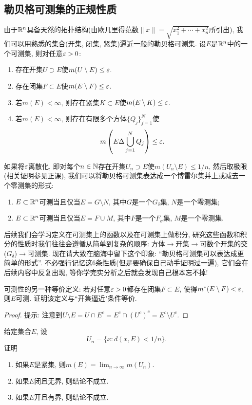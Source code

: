 \subsection{勒贝格可测集的正规性质}
由于$\mathbb{R}^n$具备天然的拓扑结构(由欧几里得范数$\|x\|=\sqrt{x_1^2 + \cdots + x_n^2}$所引出), 我们可以用熟悉的集合(开集, 闭集, 紧集)逼近一般的勒贝格可测集. 
设$E$是$\mathbb{R}^n$中的一个可测集, 则对任意$\varepsilon>0$:
\begin{enumerate}
    \item 存在开集$U \supset E$使$m(U \setminus E)\leq \varepsilon$.
    \item 存在闭集$F \subset E$使$m(E \setminus F)\leq \varepsilon$.
    \item 若$m(E)<\infty$, 则存在紧集$K\subset E$使$m(E \setminus K) \leq \varepsilon$. 
    \item 若$m(E)<\infty$, 则存在有限多个方体$\{Q_j\}_{j=1}^N$使
    $$m\left(E \Delta \bigcup_{j=1}^{N}Q_j\right) \leq \varepsilon.$$
\end{enumerate}
如果将$\varepsilon$离散化, 即对每个$n \in \mathbb{N}$存在开集$U_n \supset E$使$m(U_n \setminus E) \leq 1/n$, 然后取极限(相关证明参见正课), 我们可以将勒贝格可测集表达成一个博雷尔集并上或减去一个零测集的形式:
\begin{enumerate}
    \item $E \subset \mathbb{R}^n$可测当且仅当$E=G \setminus N$, 其中$G$是一个$G_\delta$集, $N$是一个零测集;
    \item $E \subset \mathbb{R}^n$可测当且仅当$E=F \cup M$, 其中$F$是一个$F_\sigma$集, $M$是一个零测集. 
\end{enumerate}
后续我们会学习定义在可测集上的函数以及在可测集上做积分, 研究这些函数和积分的性质时我们往往会遵循从简单到复杂的顺序: 
方体$\rightarrow$开集$\rightarrow$可数个开集的交($G_\delta$)$\rightarrow$可测集. 现在请大致在脑海中留下这个印象: “勒贝格可测集可以表达成更简单的形式”. 不必强行记忆这6条性质(但是要确保自己动手证明过一遍), 它们会在后续内容中反复出现, 等你学完实分析之后就会发现自己根本忘不掉! 
\begin{exercise} %
    可测性的另一种等价定义: 若对任意$\varepsilon>0$都存在闭集$F \subset E$, 使得$m^*(E \setminus F) < \varepsilon$, 则$E$可测. 证明该定义与``开集逼近"条件等价.     
\end{exercise}
\begin{proof}
    提示: 注意到$U \setminus E = U \cap E^c = E^c \cap (U^c)^c = E^c \setminus U^c$.
\end{proof}
\begin{exercise}
    给定集合$E$, 设
    $$U_n = \{x: d(x,E)<1/n\}.$$ 证明
    \begin{enumerate}
    \item 如果$E$是紧集, 则$m(E)=\lim_{n\to \infty}m(U_n)$.
    \item 如果$E$闭且无界, 则结论不成立.
    \item 如果$E$开且有界, 则结论不成立.
    \end{enumerate}
\end{exercise}
